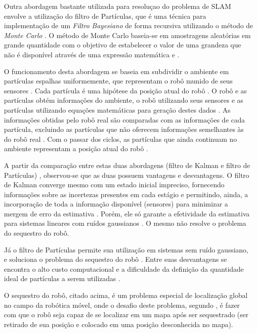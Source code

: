 Outra abordagem bastante utilizada para resoluçao do problema de SLAM envolve a utilização do filtro de Partículas, que é uma técnica para implementação de um \textit{Filtro Bayesiano} de forma recursiva utilizando o método de \textit{Monte Carlo} \cite{integrationVisionSLAMnonlinear}. O método de Monte Carlo baseia-se em amostragens aleatórias em grande quantidade com o objetivo de estabelecer o valor de uma grandeza que não é disponível através de uma expressão matemática \cite{mooney1997monte} e \cite{comparacaoKalmanParticulas}.

O funcionamento desta abordagem se baseia em subdividir o ambiente em partículas espalhas uniformemente, que representam o robô munido de seus sensores \cite{comparacaoKalmanParticulas}. Cada partícula é uma hipótese da posição atual do robô \cite{dp-slam}. O robô e as partículas obtém informações do ambiente, o robô utilizando seus sensores e as partículas utilizando equações matemáticas para geração destes dados \cite{comparacaoKalmanParticulas}. As informações obtidas pelo robô real são comparadas com as informações de cada partícula, excluindo as partículas que não oferecem informações semelhantes às do robô real \cite{comparacaoKalmanParticulas}. Com o passar dos ciclos, as partículas que ainda continuam no ambiente representam a posição atual do robô \cite{comparacaoKalmanParticulas}.

A partir da comparação entre estas duas abordagens (filtro de Kalman e filtro de Partículas) \cite{comparacaoKalmanParticulas}, observou-se que as duas possuem vantagens e desvantagens. O filtro de Kalman converge mesmo com um estado inicial impreciso, fornecendo informações sobre as incertezas presentes em cada estágio e permitindo, ainda, a incorporação de toda a informação disponível (sensores) para minimizar a mergem de erro da estimativa \cite{comparacaoKalmanParticulas}. Porém, ele só garante a efetividade da estimativa para sistemas lineares com ruídos gaussianos \cite{comparacaoKalmanParticulas}. O mesmo não resolve o problema do sequestro do robô.

Já o filtro de Partículas permite sua utilização em sistemas sem ruído gaussiano, e soluciona o problema do sequestro do robô \cite{filtroParticulasComLEGO}. Entre suas desvantagens se encontra o alto custo computacional e a dificuldade da definição da quantidade ideal de partículas a serem utilizadas \cite{comparacaoKalmanParticulas}.

O sequestro do robô, citado acima, é um problema especial de localização global no campo da robótica móvel, onde o desafio deste problema, segundo \cite{sequestroRobo}, é fazer com que o robô seja capaz de se localizar em um mapa após ser sequestrado (ser retirado de sua posição e colocado em uma posição desconhecida no mapa).

